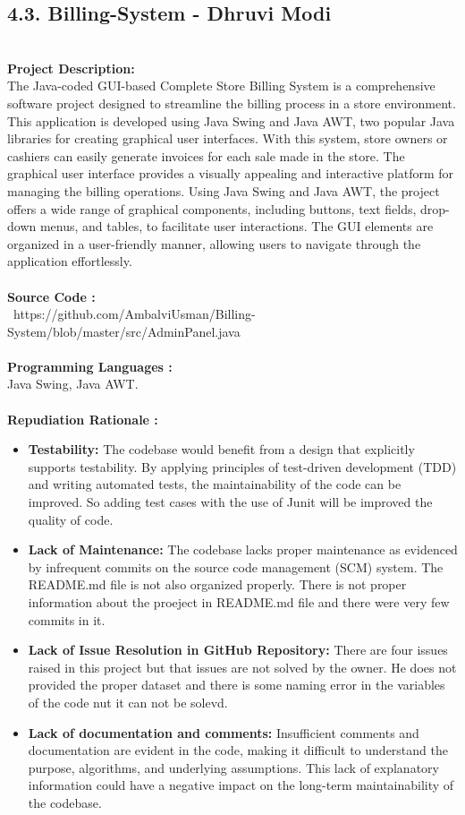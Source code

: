 \documentclass[12pt,letterpaper]{report}
\begin{document}
\subsection*{4.3. Billing-System - Dhruvi Modi } \\
\normalsize {\textbf{Project Description:}} \\
\normalsize {The Java-coded GUI-based Complete Store Billing System is a comprehensive software project designed to streamline the billing process in a store environment. This application is developed using Java Swing and Java AWT, two popular Java libraries for creating graphical user interfaces. With this system, store owners or cashiers can easily generate invoices for each sale made in the store. The graphical user interface provides a visually appealing and interactive platform for managing the billing operations. Using Java Swing and Java AWT, the project offers a wide range of graphical components, including buttons, text fields, drop-down menus, and tables, to facilitate user interactions. The GUI elements are organized in a user-friendly manner, allowing users to navigate through the application effortlessly. }\\
\\
\normalsize{\textbf{Source Code :}} \\
\normalsize{\ https://github.com/AmbalviUsman/Billing-System/blob/master/src/AdminPanel.java}\\
\\
\normalsize{\textbf{Programming Languages :}}\\
\normalsize{Java Swing, Java AWT.}\\
\\
\normalsize{\textbf{Repudiation Rationale : }}\\
\begin{itemize}
    \item \textbf{Testability: }The codebase would benefit from a design that explicitly supports testability. By applying principles of test-driven development (TDD) and writing automated tests, the maintainability of the code can be improved. So adding test cases with the use of Junit will be improved the quality of code.
    \item \textbf{Lack of Maintenance: }The codebase lacks proper maintenance as evidenced by infrequent commits on the source code management (SCM) system. The README.md file is not also organized properly. There is not proper information about the proeject in README.md file and there were very few commits in it.
    \item \textbf{Lack of Issue Resolution in GitHub Repository: } There are four issues raised in this project but that issues are not solved by the owner. He does not provided the proper dataset and there is some naming error in the variables of the code nut it can not be solevd.
    \item \textbf{Lack of documentation and comments: } Insufficient comments and documentation are evident in the code, making it difficult to understand the purpose, algorithms, and underlying assumptions. This lack of explanatory information could have a negative impact on the long-term maintainability of the codebase.
\end{itemize}
\end{document}
